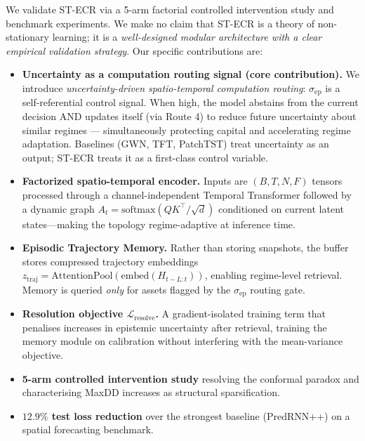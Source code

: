 \documentclass[11pt,a4paper]{article}
\newcommand{\sep}{\sigma_{\mathrm{ep}}}
\newcommand{\ztraj}{z_{\mathrm{traj}}}
\newcommand{\Lres}{\mathcal{L}_{\mathrm{resolve}}}
\begin{document}
We validate ST-ECR via a 5-arm factorial controlled intervention study and
benchmark experiments.  We make no claim that ST-ECR is a theory of
non-stationary learning; it is a \emph{well-designed modular architecture
with a clear empirical validation strategy}.  Our specific contributions are:

\begin{itemize}
\item \textbf{Uncertainty as a computation routing signal (core contribution).}
  We introduce \emph{uncertainty-driven spatio-temporal computation routing}:
  $\sep$ is a self-referential control signal. When high, the model abstains from the
  current decision AND updates itself (via Route 4) to reduce future uncertainty about 
  similar regimes --- simultaneously protecting capital and accelerating regime adaptation.
  Baselines (GWN, TFT, PatchTST) treat uncertainty as an output;
  ST-ECR treats it as a first-class control variable.

\item \textbf{Factorized spatio-temporal encoder.}
  Inputs are $(B, T, N, F)$ tensors processed through a channel-independent
  Temporal Transformer followed by a dynamic graph
  $A_t = \mathrm{softmax}(QK^\top/\sqrt{d})$ conditioned on current latent
  states---making the topology regime-adaptive at inference time.

\item \textbf{Episodic Trajectory Memory.}
  Rather than storing snapshots, the buffer stores compressed trajectory
  embeddings $\ztraj = \mathrm{AttentionPool}(\mathrm{embed}(H_{t-L:t}))$,
  enabling regime-level retrieval.  Memory is queried \emph{only} for assets
  flagged by the $\sep$ routing gate.

\item \textbf{Resolution objective $\Lres$.}
  A gradient-isolated training term that penalises increases in epistemic
  uncertainty after retrieval, training the memory module on calibration
  without interfering with the mean-variance objective.

\item \textbf{5-arm controlled intervention study} resolving the conformal
  paradox and characterising MaxDD increases as structural sparsification.

\item \textbf{$12.9\%$ test loss reduction} over the strongest baseline
  (PredRNN++) on a spatial forecasting benchmark.
\end{itemize}
\end{document}
